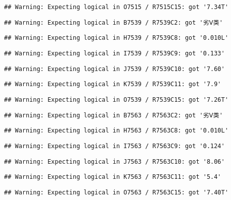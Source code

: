 \documentclass[
]{article}
\begin{document}
\begin{verbatim}
## Warning: Expecting logical in O7515 / R7515C15: got '7.34T'
\end{verbatim}

\begin{verbatim}
## Warning: Expecting logical in B7539 / R7539C2: got '劣Ⅴ类'
\end{verbatim}

\begin{verbatim}
## Warning: Expecting logical in H7539 / R7539C8: got '0.010L'
\end{verbatim}

\begin{verbatim}
## Warning: Expecting logical in I7539 / R7539C9: got '0.133'
\end{verbatim}

\begin{verbatim}
## Warning: Expecting logical in J7539 / R7539C10: got '7.60'
\end{verbatim}

\begin{verbatim}
## Warning: Expecting logical in K7539 / R7539C11: got '7.9'
\end{verbatim}

\begin{verbatim}
## Warning: Expecting logical in O7539 / R7539C15: got '7.26T'
\end{verbatim}

\begin{verbatim}
## Warning: Expecting logical in B7563 / R7563C2: got '劣Ⅴ类'
\end{verbatim}

\begin{verbatim}
## Warning: Expecting logical in H7563 / R7563C8: got '0.010L'
\end{verbatim}

\begin{verbatim}
## Warning: Expecting logical in I7563 / R7563C9: got '0.124'
\end{verbatim}

\begin{verbatim}
## Warning: Expecting logical in J7563 / R7563C10: got '8.06'
\end{verbatim}

\begin{verbatim}
## Warning: Expecting logical in K7563 / R7563C11: got '5.4'
\end{verbatim}

\begin{verbatim}
## Warning: Expecting logical in O7563 / R7563C15: got '7.40T'
\end{verbatim}
\end{document}
